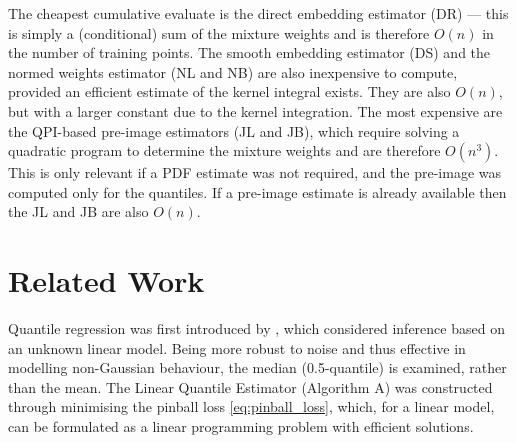 \documentclass[twoside]{article} \usepackage{aistats2017}
\theoremstyle{definition}
\theoremstyle{theorem}
\newcommand{\qpi}{QPI}
\begin{document}
	The cheapest cumulative evaluate is the direct embedding estimator (DR) --- this is simply a (conditional) sum of the mixture weights and is therefore $O(n)$ in the number of training points. The smooth embedding estimator (DS) and the normed weights estimator (NL and NB) are also inexpensive to compute, provided an efficient estimate of the kernel integral exists. They are also $O(n)$, but with a larger constant due to the kernel integration. The most expensive are the \qpi\space-based pre-image estimators (JL and JB), which require solving a quadratic program to determine the mixture weights and are therefore $O(n^3)$. This is only relevant if a PDF estimate was not required, and the pre-image was computed only for the quantiles. If a pre-image estimate is already available then the JL and JB are also $O(n)$.
	
\section{Related Work}
\label{sec:related_work}

	Quantile regression was first introduced by \cite{koenker1978regression}, which considered inference based on an unknown linear model. Being more robust to noise and thus effective in modelling non-Gaussian behaviour, the median (0.5-quantile) is examined, rather than the mean. The Linear Quantile Estimator (Algorithm A) was constructed through minimising the pinball loss \eqref{eq:pinball_loss}, which, for a linear model, can be formulated as a linear programming problem with efficient solutions.
	
\end{document}

